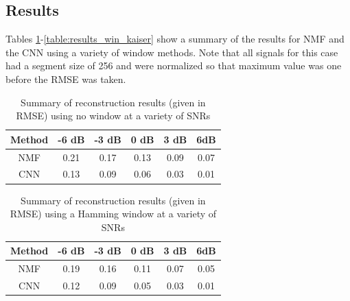\documentclass[12pt,chapterheads]{ucsd}
\begin{document}
\subsection{Results}
Tables \ref{table:results_win_none}-\ref{table:results_win_kaiser} show a summary of the results  for NMF and the CNN using a variety of window methods. Note that all signals for this case had a segment size of 256 and were normalized so that maximum value was one before the RMSE was taken.

\vspace{0.25in}
\begin{table}[!ht]
\caption{Summary of reconstruction results (given in RMSE) using no window at a variety of SNRs}

\vspace{-0.25in}
\begin{center}
\begin{tabular}{| c | c | c |  c | c | c |}

\hline
Method & -6 dB & -3 dB & 0 dB & 3 dB & 6dB \\

\hline
NMF & 0.21 & 0.17 & 0.13 & 0.09 & 0.07 \\

\hline
CNN & 0.13 & 0.09 & 0.06 & 0.03 & 0.01 \\

\hline
\end{tabular}
\end{center}
\label{table:results_win_none}
\end{table}

\vspace{0.25in}
\begin{table}[!ht]
\caption{Summary of reconstruction results (given in RMSE) using a Hamming window at a variety of SNRs}

\vspace{-0.25in}
\begin{center}
\begin{tabular}{| c | c | c |  c | c | c |}

\hline
Method & -6 dB & -3 dB & 0 dB & 3 dB & 6dB \\

\hline
NMF & 0.19 & 0.16 & 0.11 & 0.07 & 0.05 \\

\hline
CNN & 0.12 & 0.09 & 0.05 & 0.03 & 0.01 \\

\hline
\end{tabular}
\end{center}
\label{table:results_win_hamming}
\end{table}
\end{document}
